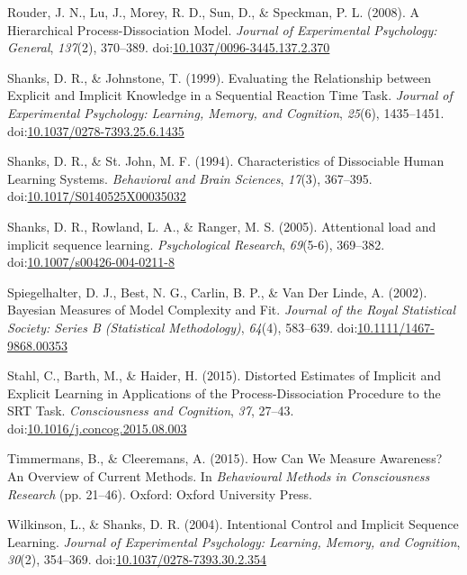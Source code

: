 \documentclass[floatsintext,man]{apa6}
\begin{document}
\hypertarget{ref-rouderux5fhierarchicalux5f2008}{}
Rouder, J. N., Lu, J., Morey, R. D., Sun, D., \& Speckman, P. L. (2008).
A Hierarchical Process-Dissociation Model. \emph{Journal of Experimental
Psychology: General}, \emph{137}(2), 370--389.
doi:\href{https://doi.org/10.1037/0096-3445.137.2.370}{10.1037/0096-3445.137.2.370}

\hypertarget{ref-shanksux5fevaluatingux5f1999}{}
Shanks, D. R., \& Johnstone, T. (1999). Evaluating the Relationship
between Explicit and Implicit Knowledge in a Sequential Reaction Time
Task. \emph{Journal of Experimental Psychology: Learning, Memory, and
Cognition}, \emph{25}(6), 1435--1451.
doi:\href{https://doi.org/10.1037/0278-7393.25.6.1435}{10.1037/0278-7393.25.6.1435}

\hypertarget{ref-shanksux5fcharacteristicsux5f1994}{}
Shanks, D. R., \& St. John, M. F. (1994). Characteristics of Dissociable
Human Learning Systems. \emph{Behavioral and Brain Sciences},
\emph{17}(3), 367--395.
doi:\href{https://doi.org/10.1017/S0140525X00035032}{10.1017/S0140525X00035032}

\hypertarget{ref-shanksux5fattentionalux5f2005}{}
Shanks, D. R., Rowland, L. A., \& Ranger, M. S. (2005). Attentional load
and implicit sequence learning. \emph{Psychological Research},
\emph{69}(5-6), 369--382.
doi:\href{https://doi.org/10.1007/s00426-004-0211-8}{10.1007/s00426-004-0211-8}

\hypertarget{ref-spiegelhalterux5fbayesianux5f2002}{}
Spiegelhalter, D. J., Best, N. G., Carlin, B. P., \& Van Der Linde, A.
(2002). Bayesian Measures of Model Complexity and Fit. \emph{Journal of
the Royal Statistical Society: Series B (Statistical Methodology)},
\emph{64}(4), 583--639.
doi:\href{https://doi.org/10.1111/1467-9868.00353}{10.1111/1467-9868.00353}

\hypertarget{ref-stahlux5fdistortedux5f2015}{}
Stahl, C., Barth, M., \& Haider, H. (2015). Distorted Estimates of
Implicit and Explicit Learning in Applications of the
Process-Dissociation Procedure to the SRT Task. \emph{Consciousness and
Cognition}, \emph{37}, 27--43.
doi:\href{https://doi.org/10.1016/j.concog.2015.08.003}{10.1016/j.concog.2015.08.003}

\hypertarget{ref-timmermansux5fhowux5f2015}{}
Timmermans, B., \& Cleeremans, A. (2015). How Can We Measure Awareness?
An Overview of Current Methods. In \emph{Behavioural Methods in
Consciousness Research} (pp. 21--46). Oxford: Oxford University Press.

\hypertarget{ref-wilkinsonux5fintentionalux5f2004}{}
Wilkinson, L., \& Shanks, D. R. (2004). Intentional Control and Implicit
Sequence Learning. \emph{Journal of Experimental Psychology: Learning,
Memory, and Cognition}, \emph{30}(2), 354--369.
doi:\href{https://doi.org/10.1037/0278-7393.30.2.354}{10.1037/0278-7393.30.2.354}
\end{document}

